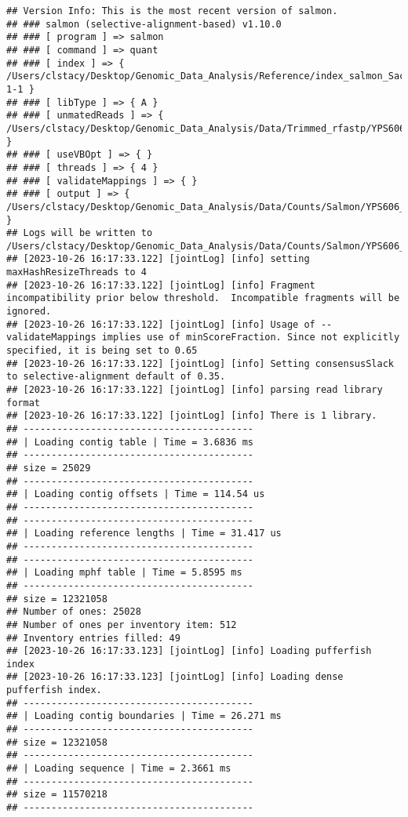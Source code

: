 \documentclass[
]{book}
\begin{document}
\begin{verbatim}
## Version Info: This is the most recent version of salmon.
## ### salmon (selective-alignment-based) v1.10.0
## ### [ program ] => salmon 
## ### [ command ] => quant 
## ### [ index ] => { /Users/clstacy/Desktop/Genomic_Data_Analysis/Reference/index_salmon_Saccharomyces_cerevisiae.R64-1-1 }
## ### [ libType ] => { A }
## ### [ unmatedReads ] => { /Users/clstacy/Desktop/Genomic_Data_Analysis/Data/Trimmed_rfastp/YPS606_WT_ETOH_REP3_R1.fastq.gz }
## ### [ useVBOpt ] => { }
## ### [ threads ] => { 4 }
## ### [ validateMappings ] => { }
## ### [ output ] => { /Users/clstacy/Desktop/Genomic_Data_Analysis/Data/Counts/Salmon/YPS606_WT_ETOH_REP3_R1.fastq.gz_quant }
## Logs will be written to /Users/clstacy/Desktop/Genomic_Data_Analysis/Data/Counts/Salmon/YPS606_WT_ETOH_REP3_R1.fastq.gz_quant/logs
## [2023-10-26 16:17:33.122] [jointLog] [info] setting maxHashResizeThreads to 4
## [2023-10-26 16:17:33.122] [jointLog] [info] Fragment incompatibility prior below threshold.  Incompatible fragments will be ignored.
## [2023-10-26 16:17:33.122] [jointLog] [info] Usage of --validateMappings implies use of minScoreFraction. Since not explicitly specified, it is being set to 0.65
## [2023-10-26 16:17:33.122] [jointLog] [info] Setting consensusSlack to selective-alignment default of 0.35.
## [2023-10-26 16:17:33.122] [jointLog] [info] parsing read library format
## [2023-10-26 16:17:33.122] [jointLog] [info] There is 1 library.
## -----------------------------------------
## | Loading contig table | Time = 3.6836 ms
## -----------------------------------------
## size = 25029
## -----------------------------------------
## | Loading contig offsets | Time = 114.54 us
## -----------------------------------------
## -----------------------------------------
## | Loading reference lengths | Time = 31.417 us
## -----------------------------------------
## -----------------------------------------
## | Loading mphf table | Time = 5.8595 ms
## -----------------------------------------
## size = 12321058
## Number of ones: 25028
## Number of ones per inventory item: 512
## Inventory entries filled: 49
## [2023-10-26 16:17:33.123] [jointLog] [info] Loading pufferfish index
## [2023-10-26 16:17:33.123] [jointLog] [info] Loading dense pufferfish index.
## -----------------------------------------
## | Loading contig boundaries | Time = 26.271 ms
## -----------------------------------------
## size = 12321058
## -----------------------------------------
## | Loading sequence | Time = 2.3661 ms
## -----------------------------------------
## size = 11570218
## -----------------------------------------

\end{verbatim}
\end{document}
